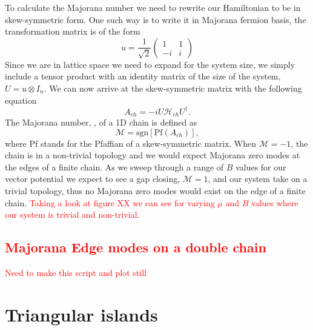 \documentclass[aps,prb,showpacs,twocolumn,amsmath,amssymb,superscriptaddress]{revtex4-2}
\newcommand{\Red}[1]{\textcolor{red}{#1}}
\newcommand{\Ham}{\mathcal{H}}
\begin{document}
To calculate the Majorana number we need to rewrite our Hamiltonian to be in skew-symmetric form.
One such way is to write it in Majorana fermion basis, the transformation matrix is of the form
\[
  u = \dfrac{1}{\sqrt{2}} \left(
  \begin{matrix}
    1 & 1 \\
    -i & i
\end{matrix} \right)
\]
Since we are in lattice space we need to expand for the system size, we simply include a tensor product with an identity matrix of the size of the system, $U = u \otimes I_n$.
We can now arrive at the skew-symmetric matrix with the following equation
\begin{equation}
  A_{ch} = -i U \Ham_{ch} U^{\dagger}.
\end{equation}
The Majorana number, , of a 1D chain is defined as
\begin{equation}
  \mathcal{M} = \text{sgn}[\text{Pf}(A_{ch})],
\end{equation}
where $\text{Pf}$ stands for the Pfaffian of a skew-symmetric matrix.
When $\mathcal{M} = -1$, the chain is in a non-trivial topology and we would expect Majorana zero modes at the edges of a finite chain. As we sweep through a range of $B$ values for our vector potential we expect to see a gap closing, $\mathcal{M} = 1$, and our system take on a trivial topology, thus no Majorana zero modes would exist on the edge of a finite chain. \Red{Taking a look at figure XX we can see for varying $\mu$ and $B$ values where our system is trivial and non-trivial.}

\subsection{\Red{Majorana Edge modes on a double chain}}

\Red{Need to make this script and plot still}

\section{Triangular islands}
\end{document}
